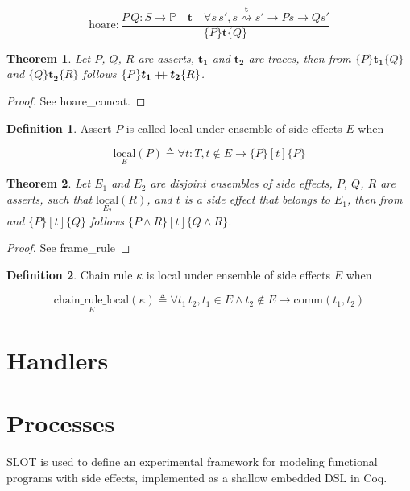 \documentclass[10pt,letterpaper]{article}
\newcommand \prop{\mathds{P}}
\newcommand \chain[3]{\mathrel{#1\stackrel{#3}{\rightsquigarrow}#2}}
\newcommand \bm[1]{\boldsymbol{#1}}
\newcommand \comm[2]{\mathrel{\text{comm}\left(#1,#2\right)}}
\newcommand \local[2]{\mathrel{\underset{#1}{\text{local}}\left(#2\right)}}
\newcommand \crlocal[2]{\mathrel{\underset{#1}{\text{chain\_rule\_local}}\left(#2\right)}}
\newcommand \mdoubleplus{\mathbin{+\mkern-6mu+}}
\newtheorem{theorem}{Theorem}
\theoremstyle{definition}
\newtheorem{definition}{Definition}
\begin{document}
\begin{equation}
  \text{hoare}:
  \frac{P\, Q: S \to \prop \quad \bm{t} \quad \forall s\,s', \chain{s}{s'}{\bm{t}} \to P s \to Q s'}
       {\{P\} \bm{t} \{Q\}}
\end{equation}

\begin{theorem}
  Let $P$, $Q$, $R$ are asserts, $\bm{t_1}$ and $\bm{t_2}$ are traces,
  then from $\{P\}\bm{t_1}\{Q\}$ and $\{Q\}\bm{t_2}\{R\}$ follows
  $\{P\}\bm{t_1} \mdoubleplus \bm{t_2} \{R\}$.
\end{theorem}
\begin{proof}
See \mbox{hoare\_concat}.
\end{proof}

\begin{definition}
  Assert $P$ is called local under ensemble of side effects $E$ when

  \begin{equation}
  \local{E}{P} \triangleq \forall t:T,t \notin E \to \{P\} [t] \{P\}
  \end{equation}
\end{definition}

\begin{theorem}
  Let $E_1$ and $E_2$ are disjoint ensembles of side effects, $P$,
  $Q$, $R$ are asserts, such that $\local{E_2}{R}$, and $t$ is a side
  effect that belongs to $E_1$, then from and $\{P\} [t] \{Q\}$
  follows $\{P \land R\}[t]\{Q \land R\}$.
\end{theorem}
\begin{proof}
  See \mbox{frame\_rule}
\end{proof}

\begin{definition}
  Chain rule $\kappa$ is local under ensemble of side effects $E$ when

  \begin{equation}
    \crlocal{E}{\kappa} \triangleq \forall t_1\, t_2, t_1 \in E \land t_2 \notin E \to \comm{t_1}{t_2}
  \end{equation}
\end{definition}


\section{Handlers}

\section{Processes}

SLOT is used to define an experimental framework for modeling
functional programs with side effects, implemented as a shallow
embedded DSL in Coq.
\end{document}
